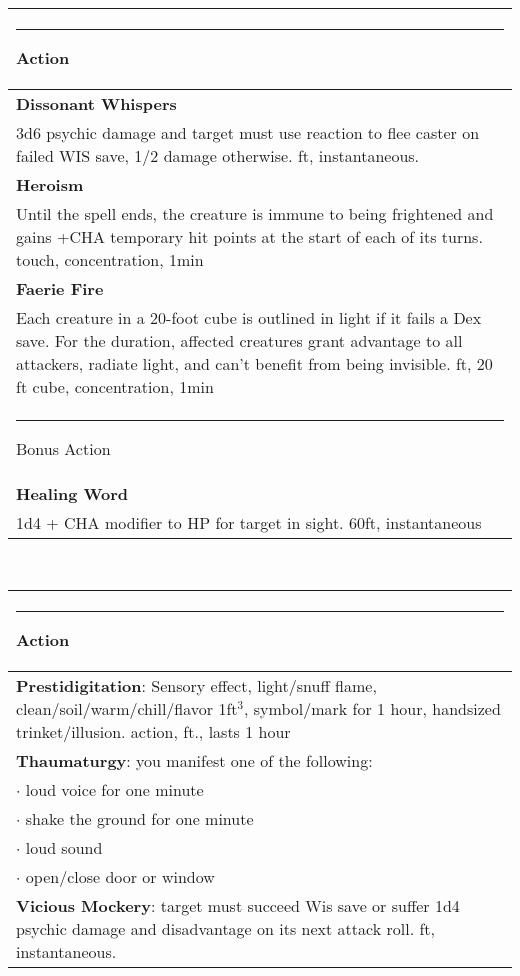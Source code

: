 \documentclass[twocolumn]{article}
\begin{document}
\\
\noindent\begin{tabular}{|m{3.1in}|}
\hline
\rule{1.25in}{0pt}Action\\
\hline
\textbf{Dissonant Whispers}\\
3d6 psychic damage and target must use reaction to flee caster on failed WIS save, 1/2 damage otherwise.  {\sc 60 ft, instantaneous}.\\
\textbf{Heroism}\\
Until the spell ends, the creature is immune to being frightened and gains +CHA temporary hit points at the start of each of its turns. {\sc touch, concentration, 1min}\\
\textbf{Faerie Fire}\\
Each creature in a 20-foot cube is outlined in light if it fails a Dex save. For the duration, affected creatures grant advantage to all attackers, radiate light, and can't benefit from being invisible. {\sc 60 ft, 20 ft cube, concentration, 1min}\\
\hline
\rule{1.1in}{0pt}Bonus Action\\
\hline
\textbf{Healing Word}\\
1d4  + CHA modifier to HP for target in sight. {\sc 60ft, instantaneous}\\
\hline
\end{tabular}
\vspace{8pt}

\\
\noindent\begin{tabular}{|m{3.1in}|}
\hline
\rule{1.25in}{0pt}Action\\
\hline
\textbf{Prestidigitation}: Sensory effect, light/snuff flame, clean/soil/warm/chill/flavor 1ft$^3$, symbol/mark for 1 hour, handsized trinket/illusion.  {\sc action, \sc 10 ft., lasts 1 hour}\\
\hline
\textbf{Thaumaturgy}: you manifest one of the following: \\
$\cdot$ loud voice for one minute \\
$\cdot$ shake the ground for one minute \\
$\cdot$ loud sound \\
$\cdot$ open/close door or window \\
\hline
\textbf{Vicious Mockery}: target must succeed Wis save or suffer 1d4 psychic damage and disadvantage on its next attack roll. {\sc 60 ft, instantaneous.}\\
\hline
\end{tabular}
\vspace{8pt}
\end{document}

